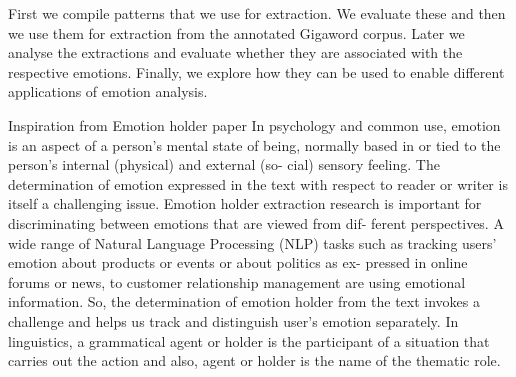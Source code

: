 First we compile patterns that we use for extraction. We evaluate these and then we use them for extraction from the annotated Gigaword corpus. Later we analyse the extractions and evaluate whether they are associated with the respective emotions. Finally, we explore how they can be used to enable different applications of emotion analysis.



Inspiration from Emotion holder paper
In psychology and common use, emotion is an aspect of a person's mental state of
being, normally based in or tied to the person's internal (physical) and external (so-
cial) sensory feeling. The determination of emotion expressed in the text with
respect to reader or writer is itself a challenging issue. Emotion holder extraction
research is important for discriminating between emotions that are viewed from dif-
ferent perspectives. A wide range of Natural Language Processing (NLP) tasks
such as tracking users' emotion about products or events or about politics as ex-
pressed in online forums or news, to customer relationship management are using
emotional information. So, the determination of emotion holder from the text invokes
a challenge and helps us track and distinguish user's emotion separately.
In linguistics, a grammatical agent or holder is the participant of a situation that carries out the action and also, agent or holder is the name of the thematic role.

